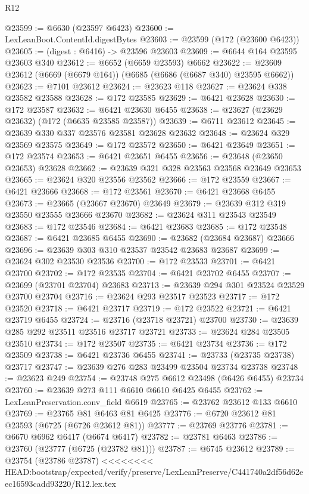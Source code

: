 \begin{lexlean}{R12}
\begin{coremodule}
{{{{{{{{{{{{{{{{{{{{{{{{{{{{{{{{{{{{{{{{{{{{{{{{{{{{{{{{{{{{{{{{{{{{{{{{{{{{{{{{{{@23599 := @6630 (@23597 @6423)
@23600 := LexLeanBoot.ContentId.digestBytes
@23603 := @23599 (@172 (@23600 @6423))
@23605 := (digest : @6416) -> @23596 @23603
@23609 := @6644 @164 @23595 @23603 @340
@23612 := @6652 (@6659 @23593) @6662
@23622 := @23609 @23612 (@6669 (@6679 @164)) (@6685 (@6686 (@6687 @340) @23595 @6662))
@23623 := @7101 @23612
@23624 := @23623 @118
@23627 := @23624 @338 @23582 @23588
@23628 := @172 @23585
@23629 := @6421 @23628
@23630 := @172 @23587
@23632 := @6421 @23630 @6455
@23638 := @23627 (@23629 @23632) (@172 (@6635 @23585 @23587))
@23639 := @6711 @23612
@23645 := @23639 @330 @337 @23576 @23581 @23628 @23632
@23648 := @23624 @329 @23569 @23575
@23649 := @172 @23572
@23650 := @6421 @23649
@23651 := @172 @23574
@23653 := @6421 @23651 @6455
@23656 := @23648 (@23650 @23653) @23628
@23662 := @23639 @321 @328 @23563 @23568 @23649 @23653
@23665 := @23624 @320 @23556 @23562
@23666 := @172 @23559
@23667 := @6421 @23666
@23668 := @172 @23561
@23670 := @6421 @23668 @6455
@23673 := @23665 (@23667 @23670) @23649
@23679 := @23639 @312 @319 @23550 @23555 @23666 @23670
@23682 := @23624 @311 @23543 @23549
@23683 := @172 @23546
@23684 := @6421 @23683
@23685 := @172 @23548
@23687 := @6421 @23685 @6455
@23690 := @23682 (@23684 @23687) @23666
@23696 := @23639 @303 @310 @23537 @23542 @23683 @23687
@23699 := @23624 @302 @23530 @23536
@23700 := @172 @23533
@23701 := @6421 @23700
@23702 := @172 @23535
@23704 := @6421 @23702 @6455
@23707 := @23699 (@23701 @23704) @23683
@23713 := @23639 @294 @301 @23524 @23529 @23700 @23704
@23716 := @23624 @293 @23517 @23523
@23717 := @172 @23520
@23718 := @6421 @23717
@23719 := @172 @23522
@23721 := @6421 @23719 @6455
@23724 := @23716 (@23718 @23721) @23700
@23730 := @23639 @285 @292 @23511 @23516 @23717 @23721
@23733 := @23624 @284 @23505 @23510
@23734 := @172 @23507
@23735 := @6421 @23734
@23736 := @172 @23509
@23738 := @6421 @23736 @6455
@23741 := @23733 (@23735 @23738) @23717
@23747 := @23639 @276 @283 @23499 @23504 @23734 @23738
@23748 := @23623 @249
@23754 := @23748 @275 @6612 @23498 (@6426 @6455) @23734
@23760 := @23639 @273 @111 @6610 @6610 @6425 @6455
@23762 := LexLeanPreservation.conv_field @6619
@23765 := @23762 @23612 @133 @6610
@23769 := @23765 @81 @6463 @81 @6425
@23776 := @6720 @23612 @81 @23593 (@6725 (@6726 @23612 @81))
@23777 := @23769 @23776
@23781 := @6670 @6962 @6417 (@6674 @6417)
@23782 := @23781 @6463
@23786 := @23760 (@23777 (@6725 (@23782 @81)))
@23787 := @6745 @23612
@23789 := @23754 (@23786 @23787)
<<<<<<<< HEAD:bootstrap/expected/verify/preserve/LexLeanPreserve/C441740a2df56d62eec16593cadd93220/R12.lex.tex
}}}}}}}}}}}}}}}}}}}}}}}}}}}}}}}}}}}}}}}}}}}}}}}}}}}}}}}}}}}}}}}}}}}}}}}}}}}}}}}}}}
\end{coremodule}
\end{lexlean}
